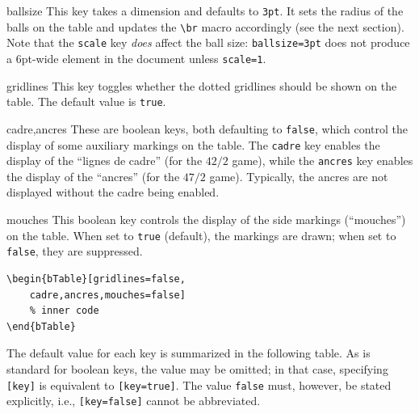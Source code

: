 \documentclass[11pt,a4paper]{ltxdoc}
\def\bluett#1{{\color{blue}\texttt{#1}}}
\begin{document}
\begin{macro}{ballsize}
    This key takes a dimension and defaults to \texttt{3pt}. It sets the radius of the balls on the table and updates the \bluett{\textbackslash br} macro accordingly (see the next section). Note that the \bluett{scale} key \textit{does} affect the ball size: \texttt{ballsize=3pt} does not produce a 6pt-wide element in the document unless \texttt{scale=1}.
\end{macro}

\begin{macro}{gridlines}
    This key toggles whether the dotted gridlines should be shown on the table. The default value is \texttt{true}.
\end{macro}

\begin{macro}{cadre,ancres}
    These are boolean keys, both defaulting to \texttt{false}, which control the display of some auxiliary markings on the table. The \bluett{cadre} key enables the display of the ``lignes de cadre'' (for the $42/2$ game), while the \bluett{ancres} key enables the display of the ``ancres'' (for the $47/2$ game). Typically, the ancres are not displayed without the cadre being enabled.
\end{macro}

\begin{macro}{mouches}
    This boolean key controls the display of the side markings (``mouches'') on the table. When set to \texttt{true} (default), the markings are drawn; when set to \texttt{false}, they are suppressed.
\end{macro}

\begin{minipage}{.56\linewidth}
    \begin{bTable}[scale=.86,gridlines=false,cadre,ancres,mouches=false]
    \end{bTable}
\end{minipage}
\begin{minipage}{.44\linewidth}
    \begin{verbatim}
\begin{bTable}[gridlines=false,
    cadre,ancres,mouches=false]
    % inner code
\end{bTable}
    \end{verbatim}
\end{minipage}\bigskip

The default value for each key is summarized in the following table. As is standard for boolean keys, the value may be omitted; in that case, specifying \texttt{[key]} is equivalent to \texttt{[key=true]}. The value \texttt{false} must, however, be stated explicitly, i.e., \texttt{[key=false]} cannot be abbreviated.
\end{document}
